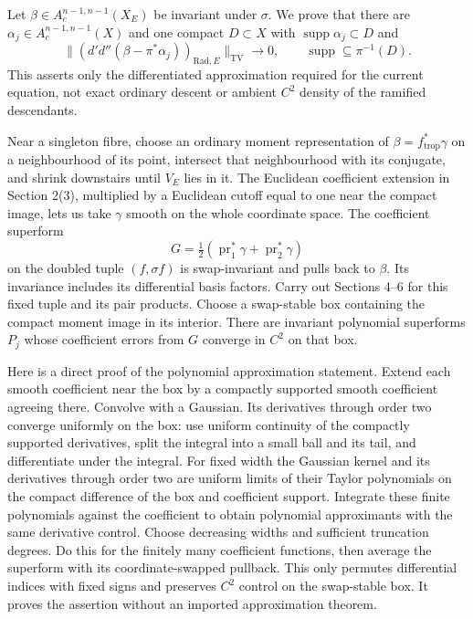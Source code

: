 \documentclass[
  11pt,
]{article}
\begin{document}
Let \(\beta\in A_c^{n-1,n-1}(X_E)\) be invariant under \(\sigma\). We
prove that there are \(\alpha_j\in A_c^{n-1,n-1}(X)\) and one compact
\(D\subset X\) with \(\operatorname{supp}\alpha_j\subset D\) and \[
 \big\|(d'd''(\beta-\pi^*\alpha_j))_{\mathrm{Rad},E}
       \big\|_{\mathrm{TV}}\to0,
 \qquad \operatorname{supp}\subseteq\pi^{-1}(D).            \tag{24}
\] This asserts only the differentiated approximation required for the
current equation, not exact ordinary descent or ambient \(C^2\) density
of the ramified descendants.

Near a singleton fibre, choose an ordinary moment representation of
\(\beta=f_{\mathrm{trop}}^*\gamma\) on a neighbourhood of its point,
intersect that neighbourhood with its conjugate, and shrink downstairs
until \(V_E\) lies in it. The Euclidean coefficient extension in Section
2(3), multiplied by a Euclidean cutoff equal to one near the compact
image, lets us take \(\gamma\) smooth on the whole coordinate space. The
coefficient superform \[
 G=\tfrac12(\operatorname{pr}_1^*\gamma+
                           \operatorname{pr}_2^*\gamma)               \tag{25}
\] on the doubled tuple \((f,\sigma f)\) is swap-invariant and pulls
back to \(\beta\). Its invariance includes its differential basis
factors. Carry out Sections 4--6 for this fixed tuple and its pair
products. Choose a swap-stable box containing the compact moment image
in its interior. There are invariant polynomial superforms \(P_j\) whose
coefficient errors from \(G\) converge in \(C^2\) on that box.

Here is a direct proof of the polynomial approximation statement. Extend
each smooth coefficient near the box by a compactly supported smooth
coefficient agreeing there. Convolve with a Gaussian. Its derivatives
through order two converge uniformly on the box: use uniform continuity
of the compactly supported derivatives, split the integral into a small
ball and its tail, and differentiate under the integral. For fixed width
the Gaussian kernel and its derivatives through order two are uniform
limits of their Taylor polynomials on the compact difference of the box
and coefficient support. Integrate these finite polynomials against the
coefficient to obtain polynomial approximants with the same derivative
control. Choose decreasing widths and sufficient truncation degrees. Do
this for the finitely many coefficient functions, then average the
superform with its coordinate-swapped pullback. This only permutes
differential indices with fixed signs and preserves \(C^2\) control on
the swap-stable box. It proves the assertion without an imported
approximation theorem.
\end{document}
